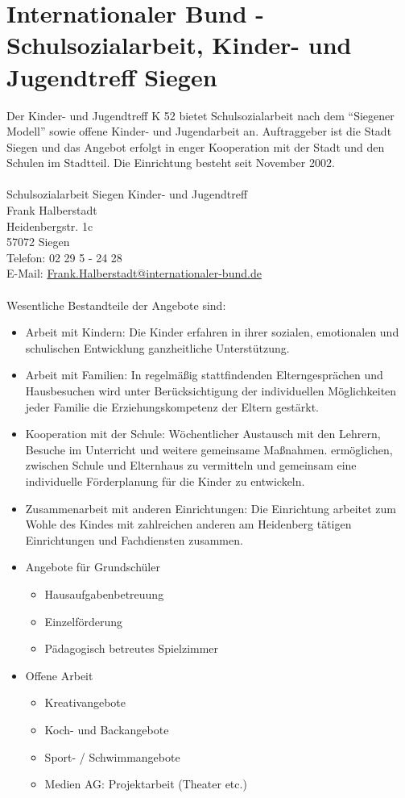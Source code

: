 \section{Internationaler Bund - Schulsozialarbeit, Kinder- und Jugendtreff Siegen}
Der Kinder- und Jugendtreff K 52 bietet Schulsozialarbeit nach dem \enquote{Siegener Modell} sowie offene Kinder- und Jugendarbeit an. Auftraggeber ist die Stadt Siegen und das Angebot erfolgt in enger Kooperation mit der Stadt und den Schulen im Stadtteil. Die Einrichtung besteht seit November 2002.\\
\\
Schulsozialarbeit Siegen Kinder- und Jugendtreff\\
Frank Halberstadt\\
Heidenbergstr. 1c\\
57072 Siegen\\
Telefon: 02 29 5 - 24 28\\
E-Mail: \href{Frank.Halberstadt@internationaler-bund.de}{Frank.Halberstadt@internationaler-bund.de}\\
\\
Wesentliche Bestandteile der Angebote sind:
\begin{itemize}
	\item Arbeit mit Kindern: Die Kinder erfahren in ihrer sozialen, emotionalen und schulischen Entwicklung ganzheitliche Unterstützung.
	\item Arbeit mit Familien: In regelmäßig stattfindenden Elterngesprächen und Hausbesuchen wird unter Berücksichtigung der individuellen Möglichkeiten jeder Familie die Erziehungskompetenz der Eltern gestärkt.
	\item Kooperation mit der Schule: Wöchentlicher Austausch mit den Lehrern, Besuche im Unterricht und weitere gemeinsame Maßnahmen. ermöglichen, zwischen Schule und Elternhaus zu vermitteln und gemeinsam eine individuelle Förderplanung für die Kinder zu entwickeln.
	\item Zusammenarbeit mit anderen Einrichtungen: Die Einrichtung arbeitet zum Wohle des Kindes mit zahlreichen anderen am Heidenberg tätigen Einrichtungen und Fachdiensten zusammen.
	\item Angebote für Grundschüler
	\begin{itemize}
		\item Hausaufgabenbetreuung
		\item Einzelförderung
		\item Pädagogisch betreutes Spielzimmer
	\end{itemize}
	\item Offene Arbeit
	\begin{itemize}
		\item Kreativangebote
		\item Koch- und Backangebote
		\item Sport- / Schwimmangebote
		\item Medien AG: Projektarbeit (Theater etc.)
	\end{itemize}
\end{itemize}